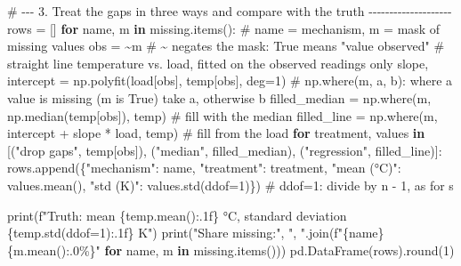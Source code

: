 \documentclass[
  letterpaper,
  DIV=11,
  numbers=noendperiod]{scrreprt}
\newenvironment{Shaded}{\begin{snugshade}}{\end{snugshade}}
\newcommand{\BuiltInTok}[1]{\textcolor[rgb]{0.00,0.23,0.31}{#1}}
\newcommand{\CommentTok}[1]{\textcolor[rgb]{0.37,0.37,0.37}{#1}}
\newcommand{\ControlFlowTok}[1]{\textcolor[rgb]{0.00,0.23,0.31}{\textbf{#1}}}
\newcommand{\DecValTok}[1]{\textcolor[rgb]{0.68,0.00,0.00}{#1}}
\newcommand{\KeywordTok}[1]{\textcolor[rgb]{0.00,0.23,0.31}{\textbf{#1}}}
\newcommand{\NormalTok}[1]{\textcolor[rgb]{0.00,0.23,0.31}{#1}}
\newcommand{\OperatorTok}[1]{\textcolor[rgb]{0.37,0.37,0.37}{#1}}
\newcommand{\SpecialCharTok}[1]{\textcolor[rgb]{0.37,0.37,0.37}{#1}}
\newcommand{\SpecialStringTok}[1]{\textcolor[rgb]{0.13,0.47,0.30}{#1}}
\newcommand{\StringTok}[1]{\textcolor[rgb]{0.13,0.47,0.30}{#1}}
\begin{document}
\begin{tcolorbox}
\begin{Shaded}
\begin{Highlighting}[]
\CommentTok{\# {-}{-}{-} 3. Treat the gaps in three ways and compare with the truth {-}{-}{-}{-}{-}{-}{-}{-}{-}{-}{-}{-}{-}{-}{-}{-}{-}{-}{-}{-}}
\NormalTok{rows }\OperatorTok{=}\NormalTok{ []}
\ControlFlowTok{for}\NormalTok{ name, m }\KeywordTok{in}\NormalTok{ missing.items():              }\CommentTok{\# name = mechanism, m = mask of missing values}
\NormalTok{    obs }\OperatorTok{=} \OperatorTok{\textasciitilde{}}\NormalTok{m                                 }\CommentTok{\# \textasciitilde{} negates the mask: True means "value observed"}
    \CommentTok{\# straight line temperature vs. load, fitted on the observed readings only}
\NormalTok{    slope, intercept }\OperatorTok{=}\NormalTok{ np.polyfit(load[obs], temp[obs], deg}\OperatorTok{=}\DecValTok{1}\NormalTok{)}
    \CommentTok{\# np.where(m, a, b): where a value is missing (m is True) take a, otherwise b}
\NormalTok{    filled\_median }\OperatorTok{=}\NormalTok{ np.where(m, np.median(temp[obs]), temp)            }\CommentTok{\# fill with the median}
\NormalTok{    filled\_line }\OperatorTok{=}\NormalTok{ np.where(m, intercept }\OperatorTok{+}\NormalTok{ slope }\OperatorTok{*}\NormalTok{ load, temp)          }\CommentTok{\# fill from the load}
    \ControlFlowTok{for}\NormalTok{ treatment, values }\KeywordTok{in}\NormalTok{ [(}\StringTok{"drop gaps"}\NormalTok{, temp[obs]),}
\NormalTok{                              (}\StringTok{"median"}\NormalTok{, filled\_median),}
\NormalTok{                              (}\StringTok{"regression"}\NormalTok{, filled\_line)]:}
\NormalTok{        rows.append(\{}\StringTok{"mechanism"}\NormalTok{: name, }\StringTok{"treatment"}\NormalTok{: treatment,}
                     \StringTok{"mean (°C)"}\NormalTok{: values.mean(),}
                     \StringTok{"std (K)"}\NormalTok{: values.std(ddof}\OperatorTok{=}\DecValTok{1}\NormalTok{)\})   }\CommentTok{\# ddof=1: divide by n {-} 1, as for s}

\BuiltInTok{print}\NormalTok{(}\SpecialStringTok{f"Truth: mean }\SpecialCharTok{\{}\NormalTok{temp}\SpecialCharTok{.}\NormalTok{mean()}\SpecialCharTok{:.1f\}}\SpecialStringTok{ °C, standard deviation }\SpecialCharTok{\{}\NormalTok{temp}\SpecialCharTok{.}\NormalTok{std(ddof}\OperatorTok{=}\DecValTok{1}\NormalTok{)}\SpecialCharTok{:.1f\}}\SpecialStringTok{ K"}\NormalTok{)}
\BuiltInTok{print}\NormalTok{(}\StringTok{"Share missing:"}\NormalTok{, }\StringTok{", "}\NormalTok{.join(}\SpecialStringTok{f"}\SpecialCharTok{\{}\NormalTok{name}\SpecialCharTok{\}}\SpecialStringTok{ }\SpecialCharTok{\{}\NormalTok{m}\SpecialCharTok{.}\NormalTok{mean()}\SpecialCharTok{:.0\%\}}\SpecialStringTok{"} \ControlFlowTok{for}\NormalTok{ name, m }\KeywordTok{in}\NormalTok{ missing.items()))}
\NormalTok{pd.DataFrame(rows).}\BuiltInTok{round}\NormalTok{(}\DecValTok{1}\NormalTok{)}
\end{Highlighting}
\end{Shaded}


\end{tcolorbox}
\end{document}
